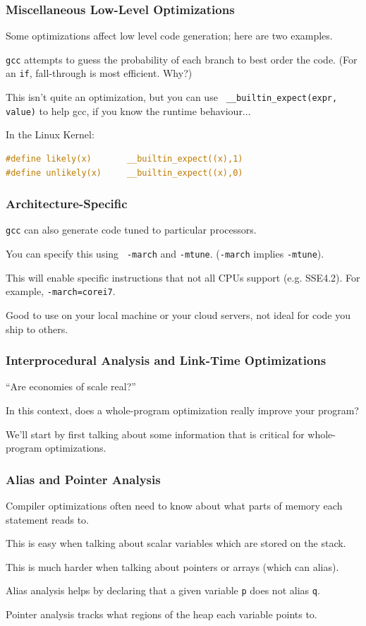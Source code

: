 \begin{frame}[fragile]
\frametitle{Miscellaneous Low-Level Optimizations}

Some optimizations affect low level code generation; here are two examples.

{\tt gcc} attempts to guess the probability of each branch to
best order the code. (For an {\tt if}, fall-through is most efficient. Why?)

This isn't quite an optimization, but you can use {\tt
  \_\_builtin\_expect(expr, value)} to help gcc, if you know the runtime behaviour...
  
  In the Linux Kernel:
  \begin{lstlisting}[language=C]
#define likely(x)       __builtin_expect((x),1)
#define unlikely(x)     __builtin_expect((x),0)
  \end{lstlisting}



\end{frame}


\begin{frame}
\frametitle{Architecture-Specific}

{\tt gcc} can also generate code tuned to particular
processors. 

You can specify this using {\tt
  -march} and {\tt -mtune}. ({\tt -march} implies {\tt -mtune}).


This will enable specific instructions that not all CPUs support (e.g. SSE4.2).
For example, {\tt -march=corei7}.

\noindent
Good to use on your local machine or your cloud servers, not ideal for code you ship to others.


\end{frame}



\begin{frame}
\frametitle{Interprocedural Analysis and Link-Time Optimizations}

``Are economies of scale real?''

In this context, does a
whole-program optimization really improve your program?


We'll start by first talking about some information that is critical for
whole-program optimizations.

\end{frame}

\begin{frame}
\frametitle{Alias and Pointer Analysis}

Compiler optimizations often need
to know about what parts of memory each statement reads to.  

This is
easy when talking about scalar variables which are stored on the
stack. 

This is much harder when talking about pointers or arrays
(which can alias). 

\alert{Alias analysis} helps by declaring that a
given variable {\tt p} does not alias {\tt q}.

\alert{Pointer analysis} tracks what regions of the heap each variable points to.

\end{frame}

